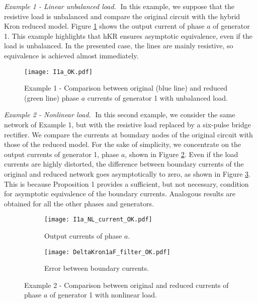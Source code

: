 \documentclass[a4paper]{article}
\theoremstyle{plain}
\begin{document}
    \textit{Example 1 - Linear unbalanced load.$\;$}
    In this example, we suppose that the resistive load is unbalanced and compare the original circuit with the hybrid Kron reduced model. 
	Figure \ref{Fig:Ex1} shows the output current of phase $a$ of generator 1. 
	This example highlights that hKR ensures asymptotic equivalence, even if the load is unbalanced. In the presented case, the lines are mainly resistive, so equivalence is achieved almost immediately. 
\begin{figure}
			\centering
\texttt{[image: I1a\_OK.pdf]}
		\caption{Example 1 - Comparison between original (blue line) and reduced (green line) phase $a$ currents of generator 1 with unbalanced load.}
		\label{Fig:Ex1}
\end{figure}

\textit{Example 2 - Nonlinear load.$\;$}
	In this second example, we consider the same network of Example 1, but with the resistive load replaced by a six-pulse bridge rectifier. We compare the currents at boundary nodes of the original circuit with those of the reduced model. For the sake of simplicity, we concentrate on the output currents of generator 1, phase $a$, shown in Figure \ref{Fig:2}. Even if the load currents are highly distorted, the difference between boundary currents of the original and reduced network goes asymptotically to zero, as shown in Figure \ref{Fig3:HybridNL3}. This is because Proposition 1 provides a sufficient, but not necessary, condition for asymptotic equivalence of the boundary currents. Analogous results are obtained for all the other phases and generators.
\begin{figure}
\centering
\begin{subfigure}[htb]{0.48\textwidth}
			\centering
			\texttt{[image: I1a\_NL\_current\_OK.pdf]}
			\caption{Output currents of phase $a$.}
			\label{Fig:2}
		\end{subfigure}
                \begin{subfigure}[htb]{0.48\textwidth}
			\centering
			\texttt{[image: DeltaKron1aF\_filter\_OK.pdf]}
			\caption{Error between boundary currents.}
			\label{Fig3:HybridNL3}
		\end{subfigure}
		\caption{Example 2 - Comparison between original and reduced currents of phase $a$ of generator 1 with nonlinear load.}
		\label{Fig3:HybridNL}
	\end{figure}
\end{document}
